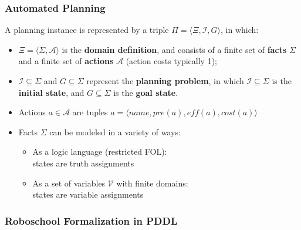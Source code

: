 \documentclass{beamer}
\newcommand{\todo}[1]{ {\color{red} #1} }
\begin{document}
	\begin{frame}[c]\frametitle{Automated Planning}
		\begin{definition} 
			A planning instance is represented by a triple $\Pi = \langle \Xi, \mathcal{I}, G\rangle$, in which:
			\begin{itemize}
				\item $\Xi = \langle \Sigma, \mathcal{A} \rangle$ is the \textbf{domain definition}, and consists of a finite set of \textbf{facts} $\Sigma$ and a finite set of \textbf{actions} $\mathcal{A}$ (action costs typically 1);
				\item $\mathcal{I} \subseteq \Sigma$ and $G \subseteq \Sigma$ represent the \textbf{planning problem}, in which $\mathcal{I} \subseteq \Sigma$ is the \textbf{initial state}, and $G \subseteq \Sigma$ is the \textbf{goal state}.
			\end{itemize}
		\end{definition}
		\begin{itemize}
			\item Actions $a \in \mathcal{A}$ are tuples $a = \langle \mathit{name}, \mathit{pre}(a), \mathit{eff}(a), \mathit{cost}(a) \rangle$
			\item Facts $\Sigma$ can be modeled in a variety of ways:
			\begin{itemize}
				\item As a logic language (restricted FOL): \\states are truth assignments
				\item As a set of variables $\mathcal{V}$ with finite domains: \\states are variable assignments
			\end{itemize}
		\end{itemize}
	\end{frame}

	\begin{frame}[t]\frametitle{Roboschool Formalization in PDDL}
		\begin{columns}
			\begin{column}[t]{0.6\textwidth}
			
			\end{column}
			\begin{column}[t]{0.4\textwidth}
			
			\end{column}
		\end{columns}
	\end{frame}
	
\end{document}
